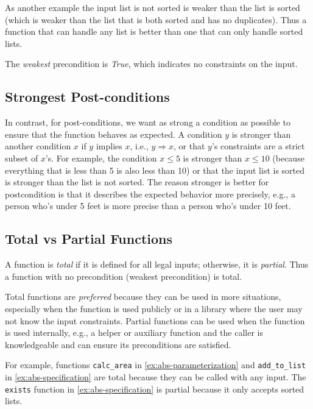 \documentclass[oneside,11pt,dvipsnames]{book}
\renewcommand{\implies}{\Rightarrow}
\newcommand{\code}[1]{\texttt{#1}}
\begin{document}
As another example the input list is not sorted is weaker than the list is sorted (which is weaker than the list that is both sorted and has no duplicates). Thus a function that can handle any list is better than one that can only handle sorted lists.

The \emph{weakest} precondition is \emph{True}, which indicates no constraints on the input.

\subsection{Strongest Post-conditions}\label{sec:strongest-postconditions}

In contrast, for post-conditions, we want as strong a condition as possible to ensure that the function behaves as expected. A condition $y$ is stronger than another condition $x$ if $y$ implies $x$, i.e., $y \implies x$, or that $y$'s constraints are a strict subset of $x$'s.
For example, the condition $x \le 5$ is stronger than $x \le 10$ (because everything that is less than 5 is also less than 10) or that the input list is sorted is stronger than the list is not sorted.   The reason stronger is better for postcondition is that it describes the expected behavior more precisely, e.g., a person who's under 5 feet is more precise than a person who's under 10 feet.

\subsection{Total vs Partial Functions}\label{sec:total-partial-function}

A function is \emph{total} if it is defined for all legal inputs; otherwise, it is \emph{partial}. Thus a function with no precondition (weakest precondition) is total.  

Total functions are \emph{preferred} because they can be used in more situations, especially when the function is used publicly or in a library where the user may not know the input constraints. Partial functions can be used when the function is used internally, e.g., a helper or auxiliary function and the caller is knowledgeable and can ensure its preconditions are satisfied.

For example, functions \code{calc\_area} in \autoref{ex:abs-parameterization} and \code{add\_to\_list} in \autoref{ex:abs-specification} are total because they can be called with any input. The \code{exists} function in \autoref{ex:abs-specification} is partial because it only accepts sorted lists.
\end{document}
